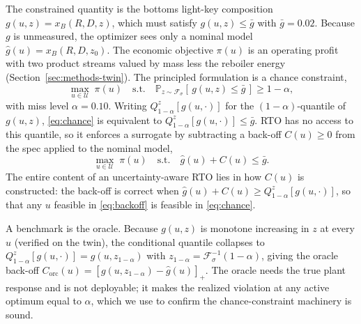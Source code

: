 \documentclass[journal]{IEEEtran}
\begin{document}
The constrained quantity is the bottoms light-key composition $g(u,z)=x_B(R,D,z)$, which must
satisfy $g(u,z)\le\bar g$ with $\bar g=0.02$. Because $g$ is unmeasured, the optimizer sees only a
nominal model $\hat g(u)=x_B(R,D,z_0)$. The economic objective $\pi(u)$ is an operating profit
with two product streams valued by mass less the reboiler energy
(Section~\ref{sec:methods-twin}). The principled formulation is a chance constraint,
\begin{equation}
\max_{u\in\mathcal U}\;\pi(u)\quad\text{s.t.}\quad
\mathbb{P}_{z\sim\mathcal F_\sigma}\!\left[\,g(u,z)\le\bar g\,\right]\ge 1-\alpha,
\label{eq:chance}
\end{equation}
with miss level $\alpha=0.10$. Writing $Q^z_{1-\alpha}[g(u,\cdot)]$ for the $(1-\alpha)$-quantile
of $g(u,z)$, \eqref{eq:chance} is equivalent to $Q^z_{1-\alpha}[g(u,\cdot)]\le\bar g$. RTO has no
access to this quantile, so it enforces a surrogate by subtracting a back-off $C(u)\ge0$ from the
spec applied to the nominal model,
\begin{equation}
\max_{u\in\mathcal U}\;\pi(u)\quad\text{s.t.}\quad \hat g(u)+C(u)\le\bar g .
\label{eq:backoff}
\end{equation}
The entire content of an uncertainty-aware RTO lies in how $C(u)$ is constructed: the back-off is
correct when $\hat g(u)+C(u)\ge Q^z_{1-\alpha}[g(u,\cdot)]$, so that any $u$ feasible in
\eqref{eq:backoff} is feasible in \eqref{eq:chance}.

A benchmark is the oracle. Because $g(u,z)$ is monotone increasing in $z$ at every $u$ (verified
on the twin), the conditional quantile collapses to $Q^z_{1-\alpha}[g(u,\cdot)]=g(u,z_{1-\alpha})$
with $z_{1-\alpha}=\mathcal F_\sigma^{-1}(1-\alpha)$, giving the oracle back-off
$C_{\mathrm{orc}}(u)=[g(u,z_{1-\alpha})-\hat g(u)]_+$. The oracle needs the true plant response and
is not deployable; it makes the realized violation at any active optimum equal to $\alpha$, which
we use to confirm the chance-constraint machinery is sound.
\end{document}
